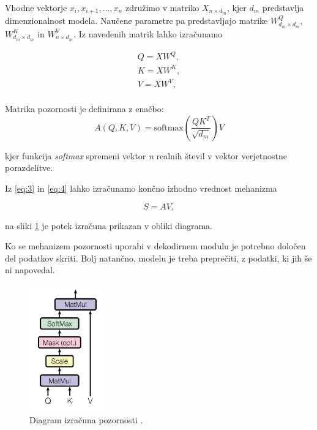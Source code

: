 \documentclass[a4paper,12pt,openright]{book}
\begin{document}
Vhodne vektorje $ x_i, x_{i+1},..., x_{n} $ združimo v matriko $ X_{n \times d_m} $, kjer $ d_m $ predstavlja dimenzionalnost modela. Naučene parametre pa predstavljajo matrike $ W^Q_{d_m \times d_m} $, $ W^K_{d_m \times d_m} $ in $ W^V_{n \times d_m} $. Iz navedenih matrik lahko izračunamo

\begin{equation}
    \begin{split}
        Q = XW^Q, \\
        K = XW^K, \\
        V = XW^V, \\
    \end{split}
    \label{eq:3}
\end{equation}

Matrika pozornosti je definirana z enačbo:
\begin{equation}
    A(Q, K, V) = \text{softmax}(\frac{QK^T}{\sqrt{d_m}})V
    \label{eq:4}
\end{equation}

kjer funkcija \emph{softmax} spremeni vektor \emph{n} realnih števil v vektor verjetnostne porazdelitve.

Iz \ref{eq:3} in \ref{eq:4} lahko izračunamo končno izhodno vrednost mehanizma

\begin{equation}
    S = AV,
    \label{eq:5}
\end{equation}

na sliki \ref{img:attention} je potek izračuna prikazan v obliki diagrama.


Ko se mehanizem pozornosti uporabi v dekodirnem modulu je potrebno določen del podatkov skriti. Bolj natančno, modelu je treba preprečiti, z podatki, ki jih še ni napovedal.


\begin{figure}[htb]
    \begin{center}
        \includegraphics[width=0.3\textwidth]{img/attention.png}
    \end{center}
    \caption{Diagram izračuna pozornosti \cite{attention_is_all_you_need}.}
    \label{img:attention}
\end{figure}
\end{document}
